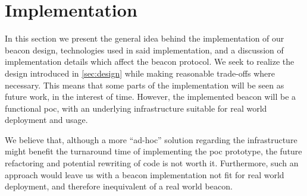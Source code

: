 \section{Implementation}%
\label{sec:implementation}

In this section we present the general idea behind the implementation of our beacon design, technologies used in said implementation, and a discussion of implementation details which affect the beacon protocol.
We seek to realize the design introduced in \cref{sec:design} while making reasonable trade-offs where necessary.
This means that some parts of the implementation will be seen as future work, in the interest of time.
However, the implemented beacon will be a functional \gls{poc}, with an underlying infrastructure suitable for real world deployment and usage.

We believe that, although a more \enquote{ad-hoc} solution regarding the infrastructure might benefit the turnaround time of implementing the \gls{poc} prototype, the future refactoring and potential rewriting of code is not worth it.
Furthermore, such an approach would leave us with a beacon implementation not fit for real world deployment, and therefore inequivalent of a real world beacon.


